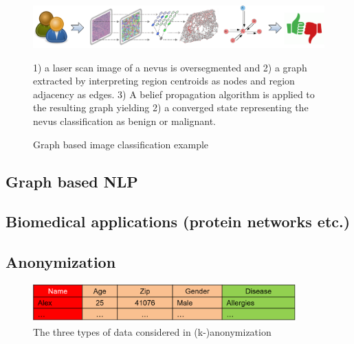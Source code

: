 	\begin{figure}[ht]
		\label{fig_graph_based_img_classification}
		\begin{center}
			\includegraphics[width=1\textwidth]{figures/graph_img_class}
			\caption{Graph based image classification example}
		\end{center}
		\small
		1) a laser scan image of a nevus is oversegmented and 2) a graph extracted by interpreting region centroids as nodes and region adjacency as edges. 3) A belief propagation algorithm is applied to the resulting graph yielding 2) a converged state representing the nevus classification as benign or malignant.
	\end{figure}
	
	\subsection{Graph based NLP}
	\label{ssect:app_graph_nlp}
	
	\subsection{Biomedical applications (protein networks etc.)}
	\label{ssect:app_biomed}
	
	\subsection{Anonymization}
	\label{ssect:app_snonymization}
	
	\begin{figure}[ht]
		\label{fig_graph_based_img_classification}
		\begin{center}
			\includegraphics[width=0.9\textwidth]{figures/anonym/3typesofdata}
			\caption{The three types of data considered in (k-)anonymization}
		\end{center}
	\end{figure}
	
